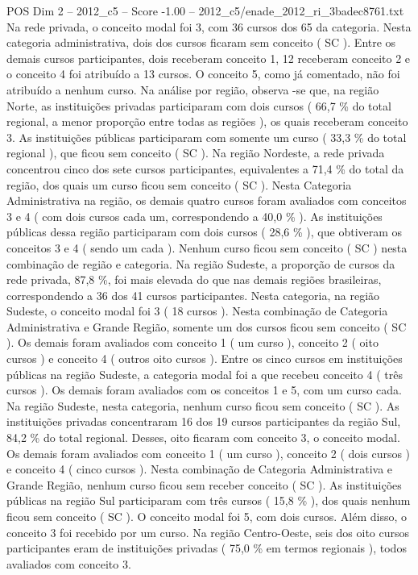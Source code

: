 \begin{textsample}{POS Dim 2 – 2012\_c5 – Score -1.00 – 2012\_c5/enade\_2012\_ri\_3badec8761.txt}
Na rede privada, o conceito modal foi 3, com 36 cursos dos 65 da categoria.
Nesta categoria administrativa, dois dos cursos ficaram sem conceito ( SC ).
Entre os demais cursos participantes, dois receberam conceito 1, 12 receberam conceito 2 e o conceito 4 foi atribuído a 13 cursos.
O conceito 5, como já comentado, não foi atribuído a nenhum curso.
Na análise por região, observa -se que, na região Norte, as instituições privadas participaram com dois cursos ( 66,7 \% do total regional, a menor proporção entre todas as regiões ), os quais receberam conceito 3.
As instituições públicas participaram com somente um curso ( 33,3 \% do total regional ), que ficou sem conceito ( SC ).
Na região Nordeste, a rede privada concentrou cinco dos sete cursos participantes, equivalentes a 71,4 \% do total da região, dos quais um curso ficou sem conceito ( SC ).
Nesta Categoria Administrativa na região, os demais quatro cursos foram avaliados com conceitos 3 e 4 ( com dois cursos cada um, correspondendo a 40,0 \% ).
As instituições públicas dessa região participaram com dois cursos ( 28,6 \% ), que obtiveram os conceitos 3 e 4 ( sendo um cada ).
Nenhum curso ficou sem conceito ( SC ) nesta combinação de região e categoria.
Na região Sudeste, a proporção de cursos da rede privada, 87,8 \%, foi mais elevada do que nas demais regiões brasileiras, correspondendo a 36 dos 41 cursos participantes.
Nesta categoria, na região Sudeste, o conceito modal foi 3 ( 18 cursos ).
Nesta combinação de Categoria Administrativa e Grande Região, somente um dos cursos ficou sem conceito ( SC ).
Os demais foram avaliados com conceito 1 ( um curso ), conceito 2 ( oito cursos ) e conceito 4 ( outros oito cursos ).
Entre os cinco cursos em instituições públicas na região Sudeste, a categoria modal foi a que recebeu conceito 4 ( três cursos ).
Os demais foram avaliados com os conceitos 1 e 5, com um curso cada.
Na região Sudeste, nesta categoria, nenhum curso ficou sem conceito ( SC ).
As instituições privadas concentraram 16 dos 19 cursos participantes da região Sul, 84,2 \% do total regional.
Desses, oito ficaram com conceito 3, o conceito modal.
Os demais foram avaliados com conceito 1 ( um curso ), conceito 2 ( dois cursos ) e conceito 4 ( cinco cursos ).
Nesta combinação de Categoria Administrativa e Grande Região, nenhum curso ficou sem receber conceito ( SC ).
As instituições públicas na região Sul participaram com três cursos ( 15,8 \% ), dos quais nenhum ficou sem conceito ( SC ).
O conceito modal foi 5, com dois cursos.
Além disso, o conceito 3 foi recebido por um curso.
Na região Centro-Oeste, seis dos oito cursos participantes eram de instituições privadas ( 75,0 \% em termos regionais ), todos avaliados com conceito 3.

\end{textsample}
